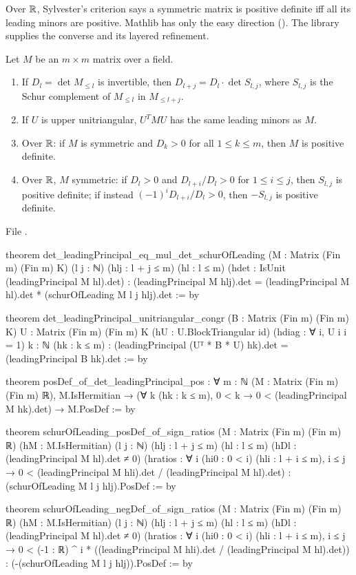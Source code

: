Over $\mathbb{R}$, Sylvester's criterion says a symmetric matrix is positive definite iff all its leading
minors are positive. Mathlib has only the easy direction (). The library
supplies the converse and its layered refinement.

\begin{theorem}\label{l19:thm:sylvester}
Let $M$ be an $m\times m$ matrix over a field.
\begin{enumerate}
\item If $D_l = \det M_{\le l}$ is invertible, then $D_{l+j} = D_l\cdot\det S_{l,j}$, where $S_{l,j}$ is
  the Schur complement of $M_{\le l}$ in $M_{\le l+j}$.
\item If $U$ is upper unitriangular, $U^TMU$ has the same leading minors as $M$.
\item Over $\mathbb{R}$: if $M$ is symmetric and $D_k>0$ for all $1\le k\le m$, then $M$ is positive definite.
\item Over $\mathbb{R}$, $M$ symmetric: if $D_l>0$ and $D_{l+i}/D_l>0$ for $1\le i\le j$, then $S_{l,j}$ is
  positive definite; if instead $(-1)^iD_{l+i}/D_l>0$, then $-S_{l,j}$ is positive definite.
\end{enumerate}
\end{theorem}

\noindent File .
\begin{leancode}
theorem det_leadingPrincipal_eq_mul_det_schurOfLeading
    (M : Matrix (Fin m) (Fin m) K) (l j : ℕ) (hlj : l + j ≤ m)
    (hl : l ≤ m) (hdet : IsUnit (leadingPrincipal M hl).det) :
    (leadingPrincipal M hlj).det
      = (leadingPrincipal M hl).det * (schurOfLeading M l j hlj).det := by

theorem det_leadingPrincipal_unitriangular_congr
    (B : Matrix (Fin m) (Fin m) K) {U : Matrix (Fin m) (Fin m) K}
    (hU : U.BlockTriangular id) (hdiag : ∀ i, U i i = 1)
    {k : ℕ} (hk : k ≤ m) :
    (leadingPrincipal (Uᵀ * B * U) hk).det = (leadingPrincipal B hk).det := by

theorem posDef_of_det_leadingPrincipal_pos :
    ∀ {m : ℕ} (M : Matrix (Fin m) (Fin m) ℝ), M.IsHermitian →
      (∀ k (hk : k ≤ m), 0 < k → 0 < (leadingPrincipal M hk).det) →
      M.PosDef := by

theorem schurOfLeading_posDef_of_sign_ratios
    (M : Matrix (Fin m) (Fin m) ℝ) (hM : M.IsHermitian) (l j : ℕ)
    (hlj : l + j ≤ m) (hl : l ≤ m)
    (hDl : (leadingPrincipal M hl).det ≠ 0)
    (hratios : ∀ i (hi0 : 0 < i) (hli : l + i ≤ m), i ≤ j →
      0 < (leadingPrincipal M hli).det / (leadingPrincipal M hl).det) :
    (schurOfLeading M l j hlj).PosDef := by

theorem schurOfLeading_negDef_of_sign_ratios
    (M : Matrix (Fin m) (Fin m) ℝ) (hM : M.IsHermitian) (l j : ℕ)
    (hlj : l + j ≤ m) (hl : l ≤ m)
    (hDl : (leadingPrincipal M hl).det ≠ 0)
    (hratios : ∀ i (hi0 : 0 < i) (hli : l + i ≤ m), i ≤ j →
      0 < (-1 : ℝ) ^ i
        * ((leadingPrincipal M hli).det / (leadingPrincipal M hl).det)) :
    (-(schurOfLeading M l j hlj)).PosDef := by
\end{leancode}

